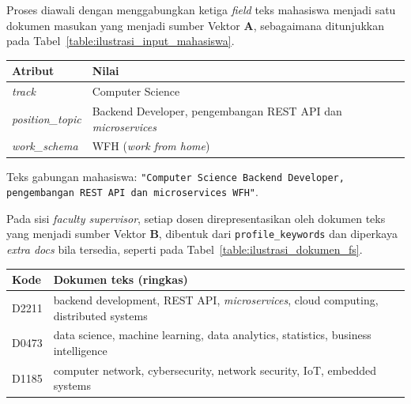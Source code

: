 Proses diawali dengan menggabungkan ketiga \textit{field} teks mahasiswa menjadi satu dokumen masukan yang menjadi sumber Vektor $\mathbf{A}$, sebagaimana ditunjukkan pada Tabel~\ref{table:ilustrasi_input_mahasiswa}.

\begin{center}
\begin{tabular}{|p{3.4cm}|p{9.3cm}|}
\hline
\textbf{Atribut} & \textbf{Nilai} \\ \hline
\textit{track} & Computer Science \\ \hline
\textit{position\_topic} & Backend Developer, pengembangan REST API dan \textit{microservices} \\ \hline
\textit{work\_schema} & WFH (\textit{work from home}) \\ \hline
\end{tabular}
\label{table:ilustrasi_input_mahasiswa}
\end{center}

\noindent Teks gabungan mahasiswa: \texttt{"Computer Science Backend Developer, pengembangan REST API dan microservices WFH"}.

Pada sisi \textit{faculty supervisor}, setiap dosen direpresentasikan oleh dokumen teks yang menjadi sumber Vektor $\mathbf{B}$, dibentuk dari \texttt{profile\_keywords} dan diperkaya \textit{extra docs} bila tersedia, seperti pada Tabel~\ref{table:ilustrasi_dokumen_fs}.

\begin{center}
\begin{tabular}{|p{2.2cm}|p{10.5cm}|}
\hline
\textbf{Kode} & \textbf{Dokumen teks (ringkas)} \\ \hline
D2211 & backend development, REST API, \textit{microservices}, cloud computing, distributed systems \\ \hline
D0473 & data science, machine learning, data analytics, statistics, business intelligence \\ \hline
D1185 & computer network, cybersecurity, network security, IoT, embedded systems \\ \hline
\end{tabular}
\label{table:ilustrasi_dokumen_fs}
\end{center}

